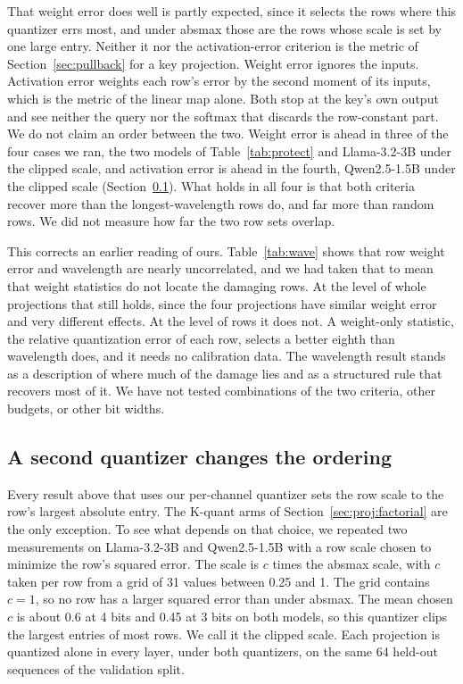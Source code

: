 \documentclass[journal]{IEEEtran}
\begin{document}
That weight error does well is partly expected, since it selects the rows where this quantizer
errs most, and under absmax those are the rows whose scale is set by one large entry. Neither it
nor the activation-error criterion is the metric of Section~\ref{sec:pullback} for a key
projection. Weight error ignores the inputs. Activation error weights each row's error by the
second moment of its inputs, which is the metric of the linear map alone. Both stop at the key's
own output and see neither the query nor the softmax that discards the row-constant part. We do
not claim an order between the two. Weight error is ahead in three of the four cases we ran, the
two models of Table~\ref{tab:protect} and Llama-3.2-3B under the clipped scale, and activation
error is ahead in the fourth, Qwen2.5-1.5B under the clipped scale
(Section~\ref{sec:proj:quant}). What holds in all four is that both criteria recover more than
the longest-wavelength rows do, and far more than random rows. We did not measure how far the two
row sets overlap.

This corrects an earlier reading of ours. Table~\ref{tab:wave} shows that row weight error and
wavelength are nearly uncorrelated, and we had taken that to mean that weight statistics do not
locate the damaging rows. At the level of whole projections that still holds, since the four
projections have similar weight error and very different effects. At the level of rows it does
not. A weight-only statistic, the relative quantization error of each row, selects a better eighth
than wavelength does, and it needs no calibration data. The wavelength result stands as a
description of where much of the damage lies and as a structured rule that recovers most of it.
We have not tested combinations of the two criteria, other budgets, or other bit widths.

\subsection{A second quantizer changes the ordering}\label{sec:proj:quant}

Every result above that uses our per-channel quantizer sets the row scale to the row's
largest absolute entry. The K-quant arms of Section~\ref{sec:proj:factorial} are the only
exception. To
see what depends on that choice, we repeated two measurements on Llama-3.2-3B and Qwen2.5-1.5B with a row scale
chosen to minimize the row's squared error. The scale is $c$ times the absmax scale, with $c$
taken per row from a grid of 31 values between 0.25 and 1. The grid contains $c = 1$, so no row
has a larger squared error than under absmax. The mean chosen $c$ is about 0.6 at 4 bits and
0.45 at 3 bits on both models, so this quantizer clips the largest entries of most rows. We call it the clipped
scale. Each projection is quantized alone in every layer, under both quantizers, on the same 64
held-out sequences of the validation split.
\end{document}
